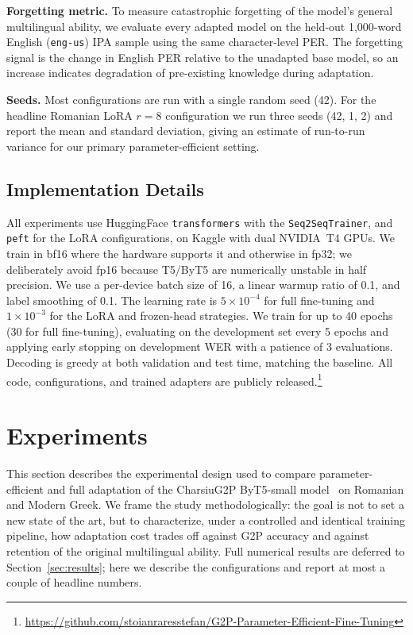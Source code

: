 \documentclass[conference]{IEEEtran}
\begin{document}
\textbf{Forgetting metric.} To measure catastrophic forgetting of the model's general multilingual ability, we evaluate every adapted model on the held-out 1{,}000-word English (\texttt{eng-us}) IPA sample using the same character-level PER. The forgetting signal is the change in English PER relative to the unadapted base model, so an increase indicates degradation of pre-existing knowledge during adaptation.

\textbf{Seeds.} Most configurations are run with a single random seed (42). For the headline Romanian LoRA $r{=}8$ configuration we run three seeds (42, 1, 2) and report the mean and standard deviation, giving an estimate of run-to-run variance for our primary parameter-efficient setting.

\subsection{Implementation Details}

All experiments use HuggingFace \texttt{transformers} with the \texttt{Seq2SeqTrainer}, and \texttt{peft} for the LoRA configurations, on Kaggle with dual NVIDIA~T4 GPUs. We train in bf16 where the hardware supports it and otherwise in fp32; we deliberately avoid fp16 because T5/ByT5 are numerically unstable in half precision. We use a per-device batch size of 16, a linear warmup ratio of 0.1, and label smoothing of 0.1. The learning rate is $5\times10^{-4}$ for full fine-tuning and $1\times10^{-3}$ for the LoRA and frozen-head strategies. We train for up to 40 epochs (30 for full fine-tuning), evaluating on the development set every 5 epochs and applying early stopping on development WER with a patience of 3 evaluations. Decoding is greedy at both validation and test time, matching the baseline. All code, configurations, and trained adapters are publicly released.\footnote{\url{https://github.com/stoianraresstefan/G2P-Parameter-Efficient-Fine-Tuning}}

\section{Experiments}\label{sec:experiments}

This section describes the experimental design used to compare parameter-efficient and full adaptation of the CharsiuG2P ByT5-small model~\cite{zhu2022,xue2022byt5} on Romanian and Modern Greek. We frame the study methodologically: the goal is not to set a new state of the art, but to characterize, under a controlled and identical training pipeline, how adaptation cost trades off against G2P accuracy and against retention of the original multilingual ability. Full numerical results are deferred to Section~\ref{sec:results}; here we describe the configurations and report at most a couple of headline numbers.
\end{document}
